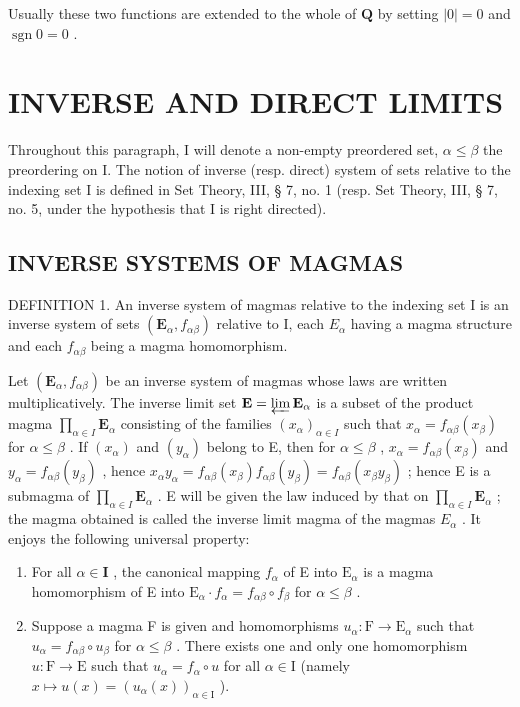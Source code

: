 Usually these two functions are extended to the whole of \(\mathbf{Q}\) by setting \(|0| = 0\) and \(\operatorname{sgn} 0 = 0\) .

\section{INVERSE AND DIRECT LIMITS}

Throughout this paragraph, I will denote a non-empty preordered set, \(\alpha \leqslant \beta\) the preordering on I. The notion of inverse (resp. direct) system of sets relative to the indexing set I is defined in Set Theory, III, § 7, no. 1 (resp. Set Theory, III, § 7, no. 5, under the hypothesis that I is right directed).

\subsection{INVERSE SYSTEMS OF MAGMAS}

DEFINITION 1. An inverse system of magmas relative to the indexing set I is an inverse system of sets \((\mathbf{E}_{\alpha}, f_{\alpha\beta})\) relative to I, each \(E_{\alpha}\) having a magma structure and each \(f_{\alpha\beta}\) being a magma homomorphism.

Let \((\mathbf{E}_{\alpha}, f_{\alpha \beta})\) be an inverse system of magmas whose laws are written multiplicatively. The inverse limit set \(\mathbf{E} = \varprojlim \mathbf{E}_{\alpha}\) is a subset of the product magma \(\prod_{\alpha \in I} \mathbf{E}_{\alpha}\) consisting of the families \((x_{\alpha})_{\alpha \in I}\) such that \(x_{\alpha} = f_{\alpha \beta}(x_{\beta})\) for \(\alpha \leqslant \beta\) . If \((x_{\alpha})\) and \((y_{\alpha})\) belong to E, then for \(\alpha \leqslant \beta\) , \(x_{\alpha} = f_{\alpha \beta}(x_{\beta})\) and \(y_{\alpha} = f_{\alpha \beta}(y_{\beta})\) , hence \(x_{\alpha}y_{\alpha} = f_{\alpha \beta}(x_{\beta})f_{\alpha \beta}(y_{\beta}) = f_{\alpha \beta}(x_{\beta}y_{\beta})\) ; hence E is a submagma of \(\prod_{\alpha \in I} \mathbf{E}_{\alpha}\) . E will be given the law induced by that on \(\prod_{\alpha \in I} \mathbf{E}_{\alpha}\) ; the magma obtained is called the inverse limit magma of the magmas \(E_{\alpha}\) . It enjoys the following universal property:

\begin{enumerate}
\def\labelenumi{(\alph{enumi})}
\item
  For all \(\alpha \in \mathbf{I}\) , the canonical mapping \(f_{\alpha}\) of E into \(\mathrm{E}_{\alpha}\) is a magma homomorphism of E into \(\mathrm{E}_{\alpha} \cdot f_{\alpha} = f_{\alpha \beta} \circ f_{\beta}\) for \(\alpha \leqslant \beta\) .
\item
  Suppose a magma F is given and homomorphisms \(u_{\alpha} \colon \mathrm{F} \to \mathrm{E}_{\alpha}\) such that \(u_{\alpha} = f_{\alpha \beta} \circ u_{\beta}\) for \(\alpha \leqslant \beta\) . There exists one and only one homomorphism \(u \colon \mathrm{F} \to \mathrm{E}\) such that \(u_{\alpha} = f_{\alpha} \circ u\) for all \(\alpha \in \mathrm{I}\) (namely \(x \mapsto u(x) = (u_{\alpha}(x))_{\alpha \in \mathrm{I}}\) ).
\end{enumerate}

